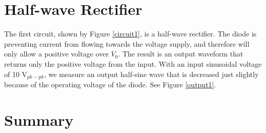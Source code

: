 \documentclass{article}
\begin{document}
\section{Half-wave Rectifier}
The first circuit, shown by Figure \ref{circuit1}, is 
a half-wave rectifier. The diode is preventing current
from flowing towards the voltage supply, and therefore
will only allow a positive voltage over $V_0$. The result
is an output waveform that returns only the positive
voltage from the input. With an input sinusoidal voltage 
of 10 V$_{pk-pk}$, we measure an output half-sine wave
that is decreased just slightly because of the operating
voltage of the diode. See Figure \ref{output1}.

\section{Summary}
\end{document}
